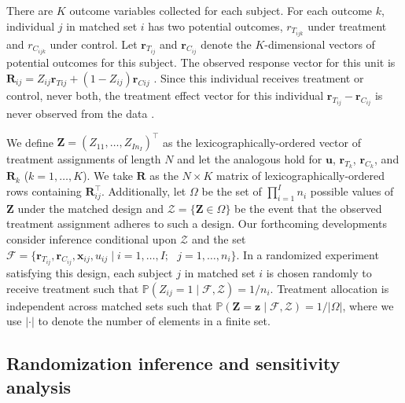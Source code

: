 \documentclass[12pt,leqno,titlepage]{amsart}
\renewcommand{\P}{\mathbb{P}}
\newcommand{\1}{\mathbbm{1}}
\begin{document}
\begin{bibunit}
There are $K$ outcome variables collected for each subject. For each outcome $k$, individual $j$ in matched set $i$ has two potential outcomes, ${r}_{T_{ijk}}$ under treatment and ${r}_{C_{ijk}}$ under control. Let $\mathbf{r}_{T_{ij}}$ and $\mathbf{r}_{C_{ij}}$ denote the $K$-dimensional vectors of potential outcomes for this subject. The observed response vector for this unit is $\mathbf{R}_{ij} = Z_{ij}\mathbf{r}_{Tij} + (1-Z_{ij})\mathbf{r}_{Cij}$ \citep{rubin1974estimating}. 
Since this individual receives treatment or control, never both, the treatment effect vector for this individual $\mathbf{r}_{T_{ij}} - \mathbf{r}_{C_{ij}}$ is never observed from the data \citep{neyman1923application,welch1937z}.

We define $\mathbf{Z} = (Z_{11}, \ldots, Z_{In_{I}})^\top$ as the lexicographically-ordered vector of treatment assignments of length $N$ and let the analogous hold for $\mathbf{u}$, $\mathbf{r}_{T_{k}}$, $\mathbf{r}_{C_{k}}$, and $\mathbf{R}_k$ ($k = 1, \ldots, K$). We take $\mathbf{R}$ as the $N \times K$ matrix of lexicographically-ordered rows containing $\mathbf{R}_{ij}^\top$. Additionally, let $\Omega$ be the set of $\prod_{i=1}^I n_i$ possible values of $\mathbf{Z}$ under the matched design and $\mathcal{Z} = \{ \mathbf{Z} \in \Omega \}$ be the event that the observed treatment assignment adheres to such a design. Our forthcoming developments consider inference conditional upon $\mathcal{Z}$ and the set $\mathcal{F}= \{ \mathbf{r}_{T_{ij}}, \mathbf{r}_{C_{ij}}, \mathbf{x}_{ij}, u_{ij} \mid i = 1, \ldots, I; \text{ } j = 1, \ldots, n_i \}$.
In a randomized experiment satisfying this design, each subject $j$ in matched set $i$ is chosen randomly to receive treatment such that $\P(Z_{ij} = 1 \mid \mathcal{F}, \mathcal{Z}) = 1/n_i$. Treatment allocation is independent across matched sets such that $\P(\mathbf{Z} = \mathbf{z} \mid \mathcal{F}, \mathcal{Z}) = 1/|\Omega|$, where we use $|\cdot|$ to denote the number of elements in a finite set.


\subsection{Randomization inference and sensitivity analysis} \label{sec: randomization-sensitivity}


\end{bibunit}
\end{document}
